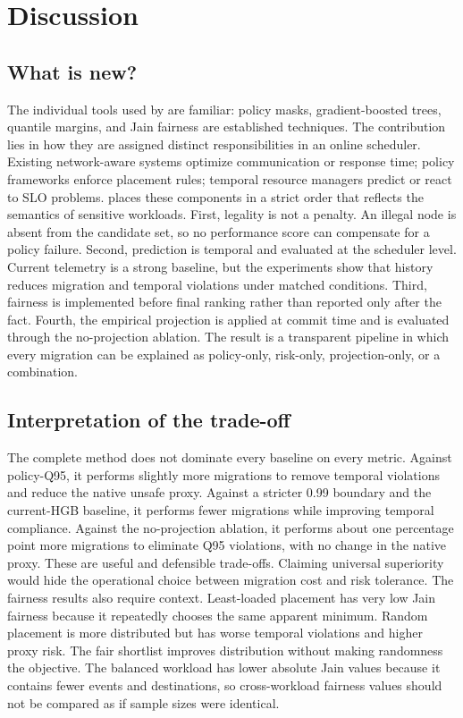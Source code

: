 \section{Discussion}\label{sec:discussion}

\subsection{What is new?}

The individual tools used by \cage are familiar: policy masks, gradient-boosted trees, quantile margins, and Jain fairness are established techniques. The contribution lies in how they are assigned distinct responsibilities in an online scheduler. Existing network-aware systems optimize communication or response time; policy frameworks enforce placement rules; temporal resource managers predict or react to SLO problems. \cage places these components in a strict order that reflects the semantics of sensitive workloads. First, legality is not a penalty. An illegal node is absent from the candidate set, so no performance score can compensate for a policy failure. Second, prediction is temporal and evaluated at the scheduler level. Current telemetry is a strong baseline, but the experiments show that history reduces migration and temporal violations under matched conditions. Third, fairness is implemented before final ranking rather than reported only after the fact. Fourth, the empirical projection is applied at commit time and is evaluated through the no-projection ablation. The result is a transparent pipeline in which every migration can be explained as policy-only, risk-only, projection-only, or a combination.

\subsection{Interpretation of the trade-off}

The complete method does not dominate every baseline on every metric. Against policy-Q95, it performs slightly more migrations to remove temporal violations and reduce the native unsafe proxy. Against a stricter 0.99 boundary and the current-HGB baseline, it performs fewer migrations while improving temporal compliance. Against the no-projection ablation, it performs about one percentage point more migrations to eliminate Q95 violations, with no change in the native proxy. These are useful and defensible trade-offs. Claiming universal superiority would hide the operational choice between migration cost and risk tolerance. The fairness results also require context. Least-loaded placement has very low Jain fairness because it repeatedly chooses the same apparent minimum. Random placement is more distributed but has worse temporal violations and higher proxy risk. The fair shortlist improves distribution without making randomness the objective. The balanced workload has lower absolute Jain values because it contains fewer events and destinations, so cross-workload fairness values should not be compared as if sample sizes were identical.

